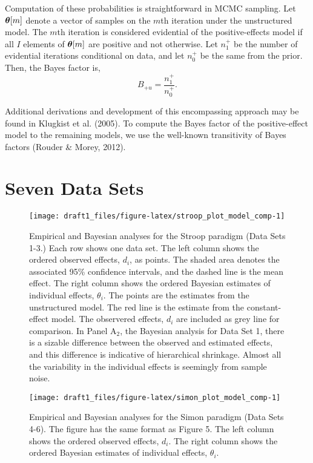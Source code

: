 \documentclass[american,man]{apa6}
\begin{document}
Computation of these probabilities is straightforward in MCMC sampling.
Let \(\bm \theta[m]\) denote a vector of samples on the \(m\)th iteration
under the unstructured model. The \(m\)th iteration is considered
evidential of the positive-effects model if all \(I\) elements of
\(\bm \theta[m]\) are positive and not otherwise. Let \(n_1^+\) be the
number of evidential iterations conditional on data, and let \(n_0^+\)
be the same from the prior. Then, the Bayes factor is, \[
B_{+u} = \frac{n_1^+}{n_0^+}.
\]

Additional derivations and development of this encompassing approach may
be found in Klugkist et al. (2005). To compute the Bayes factor of the
positive-effect model to the remaining models, we use the well-known
transitivity of Bayes factors (Rouder \& Morey, 2012).

\section{Seven Data Sets}\label{seven-data-sets}

\begin{figure}

{\centering \texttt{[image: draft1\_files/figure-latex/stroop\_plot\_model\_comp-1]} 

}

\caption{{\footnotesize Empirical and Bayesian analyses for the Stroop paradigm (Data Sets 1-3.) Each row shows one data set. The left column shows the ordered observed effects, $d_i$, as points. The shaded area denotes the associated 95\% confidence intervals, and the dashed line is the mean effect. The right column shows the ordered Bayesian estimates of individual effects, $\theta_i$. The points are the estimates from the unstructured model. The red line is the estimate from the constant-effect model. The observered effects, $d_i$ are included as grey line for comparison. In Panel $\mbox{A}_2$, the Bayesian analysis for Data Set 1, there is a sizable difference between the observed and estimated effects, and this difference is indicative of hierarchical shrinkage. Almost all the variability in the individual effects is seemingly from sample noise.}}\label{fig:stroop_plot_model_comp}
\end{figure}

\begin{figure}

{\centering \texttt{[image: draft1\_files/figure-latex/simon\_plot\_model\_comp-1]} 

}

\caption{{\footnotesize Empirical and Bayesian analyses for the Simon paradigm (Data Sets 4-6). The figure has the same format as Figure 5. The left column shows the ordered observed effects, $d_i$. The right column shows the ordered Bayesian estimates of individual effects, $\theta_i$.}}\label{fig:simon_plot_model_comp}
\end{figure}
\end{document}
